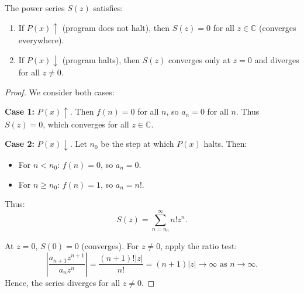 \documentclass[10pt,a4paper]{amsart}
\begin{document}
\begin{theorem}
The power series $S(z)$ satisfies:
\begin{enumerate}
\item If $P(x)\uparrow$ (program does not halt), then $S(z) = 0$ for all $z \in \mathbb{C}$ (converges everywhere).
\item If $P(x)\downarrow$ (program halts), then $S(z)$ converges only at $z = 0$ and diverges for all $z \neq 0$.
\end{enumerate}
\end{theorem}

\begin{proof}
We consider both cases:

\textbf{Case 1:} $P(x)\uparrow$. Then $f(n) = 0$ for all $n$, so $a_n = 0$ for all $n$. Thus $S(z) = 0$, which converges for all $z \in \mathbb{C}$.

\textbf{Case 2:} $P(x)\downarrow$. Let $n_0$ be the step at which $P(x)$ halts. Then:
\begin{itemize}
\item For $n < n_0$: $f(n) = 0$, so $a_n = 0$.
\item For $n \geq n_0$: $f(n) = 1$, so $a_n = n!$.
\end{itemize}

Thus:
\[
S(z) = \sum_{n=n_0}^{\infty} n! z^n.
\]

At $z = 0$, $S(0) = 0$ (converges). For $z \neq 0$, apply the ratio test:
\[
\left| \frac{a_{n+1}z^{n+1}}{a_n z^n} \right| = \frac{(n+1)!|z|}{n!} = (n+1)|z| \to \infty \text{ as } n \to \infty.
\]
Hence, the series diverges for all $z \neq 0$.
\end{proof}
\end{document}
